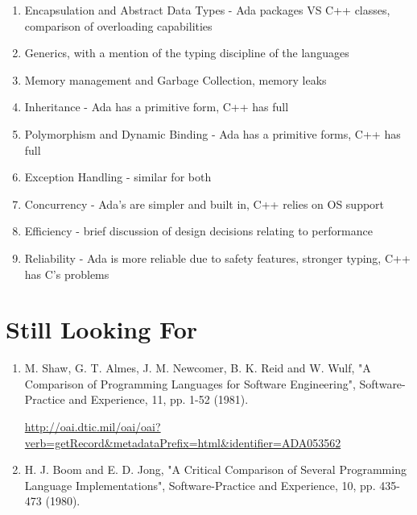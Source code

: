 \documentclass{article}
\begin{document}
\begin{enumerate}
    \item Encapsulation and Abstract Data Types - Ada packages VS C++ classes, comparison of overloading capabilities
    \item Generics, with a mention of the typing discipline of the languages
    \item Memory management and Garbage Collection, memory leaks
    \item Inheritance - Ada has a primitive form, C++ has full
    \item Polymorphism and Dynamic Binding - Ada has a primitive forms, C++ has full
    \item Exception Handling - similar for both
    \item Concurrency - Ada's are simpler and built in, C++ relies on OS support
    \item Efficiency - brief discussion of design decisions relating to performance
    \item Reliability - Ada is more reliable due to safety features, stronger typing, C++ has C's problems
\end{enumerate}




\section{Still Looking For}

\begin{enumerate}
    \item M. Shaw, G. T. Almes, J. M. Newcomer, B. K. Reid and W. Wulf, "A Comparison of Programming Languages for Software Engineering", Software-Practice and Experience, 11, pp. 1-52 (1981).

        \url{http://oai.dtic.mil/oai/oai?verb=getRecord&metadataPrefix=html&identifier=ADA053562}

\item H. J. Boom and E. D. Jong, "A Critical Comparison of Several Programming Language Implementations", Software-Practice and Experience, 10, pp. 435-473 (1980).
\end{enumerate}



\end{document}
